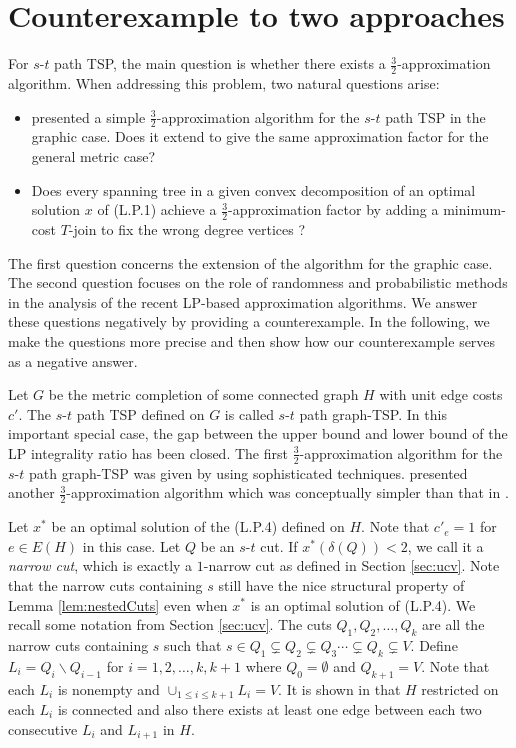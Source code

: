 \documentclass[11pt]{article}
\begin{document}
\section{Counterexample to two approaches}\label{sec:BI}
For $s$-$t$ path TSP, the main question is whether there exists a $\frac{3}{2}$-approximation algorithm. When addressing this problem, two natural questions arise:

\begin{itemize}
\item \cite{Gao13} presented a simple $\frac{3}{2}$-approximation algorithm for the $s$-$t$ path TSP in the graphic case. Does it extend to give the same approximation factor for the general metric case?
\item Does every spanning tree in a given convex decomposition of an optimal solution $x$ of (L.P.1) achieve a $\frac{3}{2}$-approximation factor by adding a minimum-cost $T$-join to fix the wrong degree vertices ?
\end{itemize}

The first question concerns the extension of the algorithm for the graphic case. The second question focuses on the role of randomness and probabilistic methods in the analysis of the recent LP-based approximation algorithms. We answer these questions negatively by providing a counterexample.
In the following, we make the questions more precise and then show how our counterexample serves as a negative answer.


Let $G$ be the metric completion of some connected graph $H$ with unit edge costs $c'$.
The $s$-$t$ path TSP defined on $G$ is called $s$-$t$ path graph-TSP. In this important special case,
the gap between the upper bound and lower bound of the LP integrality ratio has been closed. The first $\frac{3}{2}$-approximation algorithm
for the $s$-$t$ path graph-TSP was given by \cite{SV12} using sophisticated techniques. \cite{Gao13} presented another $\frac{3}{2}$-approximation
algorithm which was conceptually simpler than that in \cite{SV12}.


Let $x^*$ be an optimal solution of the (L.P.4) defined on $H$. Note that $c'_e=1$ for $e\in E(H)$ in this case.
Let $Q$ be an $s$-$t$ cut. If $x^*(\delta(Q))<2$, we call it a \emph{narrow cut}, which is exactly a $1$-narrow
cut as defined in Section \ref{sec:ucv}. Note that the narrow cuts containing $s$ still have the nice structural
property of Lemma \ref{lem:nestedCuts} even when $x^*$ is an optimal solution of (L.P.4). We recall some notation
from Section \ref{sec:ucv}. The cuts $Q_1, Q_2, \ldots, Q_k$ are all the narrow cuts containing $s$ such that
$s\in Q_1 \subsetneq Q_2 \subsetneq Q_3 \cdots \subsetneq Q_k\subsetneq V$. Define $L_i=Q_i\backslash Q_{i-1}$
for $i=1, 2, \ldots, k, k+1$ where $Q_0=\emptyset$ and $Q_{k+1}=V$. Note that each $L_i$ is nonempty and $\cup_{1\leq i\leq k+1}L_i=V$.
It is shown in \cite{Gao13} that $H$ restricted on each $L_i$ is connected and also there exists at least one edge between each two
consecutive $L_i$ and $L_{i+1}$ in $H$.
\end{document}

